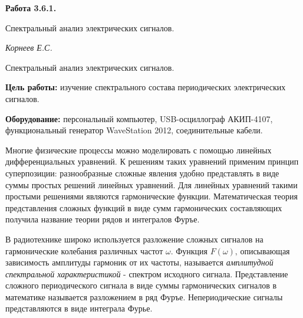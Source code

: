 \documentclass[14pt]{article}
\begin{document}
\begin{titlepage}
	\begin{center}
		\fontsize{18pt}{20pt}\selectfont
		\textbf{Работа 3.6.1.}	
	
		\vspace{5cm}
		\fontsize{24pt}{25pt}\selectfont
		Спектральный анализ электрических сигналов. 
	\end{center}
	\begin{flushright}
		\fontsize{18pt}{20pt}\selectfont
		\vspace{14cm}
		\hspace{-3cm}
		\textit{Корнеев Е.С.}
	\end{flushright}		
\end{titlepage}

\begin{center}
	\fontsize{16pt}{18pt}\selectfont	
	Спектральный анализ электрических сигналов. 
\end{center}


\fontsize{14pt}{16pt}\selectfont
\vspace{1cm}
\textbf{Цель работы:} изучение спектрального состава периодических электрических сигналов.

\vspace{0.5cm}
\textbf{Оборудование:} персональный компьютер, USB-осциллограф АКИП-4107, функциональный генератор WaveStation 2012, соединительные кабели.

\vspace{1cm}

Многие физические процессы можно моделировать с помощью линейных дифференциальных уравнений. К решениям таких уравнений применим принцип суперпозиции: разнообразные сложные явления удобно представлять в виде суммы простых решений линейных уравнений. Для линейных уравнений такими простыми решениями являются гармонические функции. Математическая теория представления сложных функций в виде сумм гармонических составляющих получила название теории рядов и интегралов Фуръе.

В радиотехнике широко используется разложение сложных сигналов на гармонические колебания различных частот $\omega$. Функция $F(\omega)$‚ описывающая зависимость амплитуды гармоник от их частоты, называется \textsl{амплитудной спектральной характеристикой} - спектром исходного сигнала. Представление сложного периодического сигнала в виде суммы гармонических сигналов в математике называется разложением в ряд Фуръе. Непериодические сигналы представляются в виде интеграла Фурье.
\end{document}
